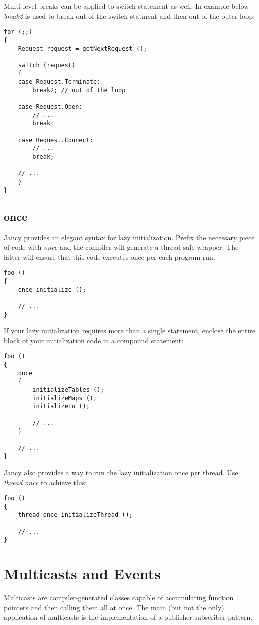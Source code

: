 \documentclass[oneside]{book}
\begin{document}
Multi-level breaks can be applied to switch statement as well. In example below \emph{break2} is used to break out of the switch statment and then out of the outer loop:

\begin{lstlisting}
for (;;)
{
    Request request = getNextRequest ();

    switch (request)
    {
    case Request.Terminate:
        break2; // out of the loop

    case Request.Open:
        // ...
        break;

    case Request.Connect:
        // ...
        break;

    // ...
    }   
}
\end{lstlisting}

\subsection{once}
Jancy provides an elegant syntax for lazy initialization. Prefix the necessary piece of code with \emph{once} and the compiler will generate a thread-safe wrapper. The latter will ensure that this code executes once per each program run.

\begin{lstlisting}
foo ()
{
    once initialize ();

    // ...
}
\end{lstlisting}

If your lazy initialization requires more than a single statement, enclose the entire block of your initialization code in a compound statement:

\begin{lstlisting}
foo ()
{
    once 
    {
        initializeTables ();
        initializeMaps ();
        initializeIo ();

        // ...
    }

    // ...
}
\end{lstlisting}

Jancy also provides a way to run the lazy initialization once per thread. Use \emph{thread once} to achieve this:

\begin{lstlisting}
foo ()
{
    thread once initializeThread (); 

    // ...
}
\end{lstlisting}

\section{Multicasts and Events}
Multicasts are compiler-generated classes capable of accumulating function pointers and then calling them all at once. The main (but not the only) application of multicasts is the implementation of a publisher-subscriber pattern.
\end{document}
